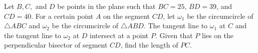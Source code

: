 Let $B, C,$ and $D$ be points in the plane such that $BC = 25$, $BD = 39$, and $CD = 40$. For a certain point $A$ on the segment $CD$, let $\omega_1$ be the circumcircle of $\triangle ABC$ and $\omega_2$ be the circumcircle of $\triangle ABD$. The tangent line to $\omega_1$ at $C$ and the tangent line to $\omega_2$ at $D$ intersect at a point $P$. Given that $P$ lies on the perpendicular bisector of segment $CD$, find the length of $PC$.
